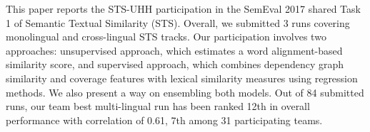This paper reports the STS-UHH participation in the SemEval 2017 shared Task 1 of Semantic Textual Similarity (STS). Overall, we submitted 3 runs covering monolingual and cross-lingual STS tracks. Our participation involves two approaches: unsupervised approach, which estimates a word alignment-based similarity score, and supervised approach, which combines dependency graph similarity and coverage features with lexical similarity measures using regression methods. We also present a way on ensembling both models. Out of 84 submitted runs, our team best multi-lingual run has been ranked 12th in overall performance with correlation of 0.61, 7th among 31 participating teams.

